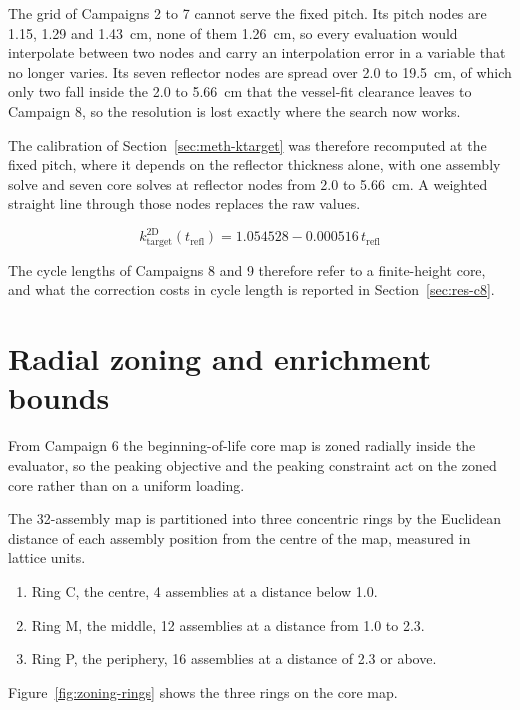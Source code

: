 The grid of Campaigns 2 to 7 cannot serve the fixed pitch. Its pitch
nodes are 1.15, 1.29 and \SI{1.43}{cm}, none of them \SI{1.26}{cm}, so
every evaluation would interpolate between two nodes and carry an
interpolation error in a variable that no longer varies. Its seven
reflector nodes are spread over 2.0 to \SI{19.5}{cm}, of which only two
fall inside the 2.0 to \SI{5.66}{cm} that the vessel-fit clearance
leaves to Campaign 8, so the resolution is lost exactly where the
search now works.

The calibration of Section~\ref{sec:meth-ktarget} was therefore
recomputed at the fixed pitch, where it depends on the reflector
thickness alone, with one assembly solve and seven core solves at
reflector nodes from 2.0 to \SI{5.66}{cm}. A weighted straight line
through those nodes replaces the raw values.

\begin{equation}
k_\mathrm{target}^\mathrm{2D}(t_\mathrm{refl}) = 1.054528 - 0.000516\, t_\mathrm{refl}
\label{eq:ktarget-c8-fit}
\end{equation}

The cycle lengths of Campaigns 8 and 9 therefore refer to a
finite-height core, and what the correction costs in cycle length is
reported in Section~\ref{sec:res-c8}.


\section{Radial zoning and enrichment bounds}
\label{sec:meth-zoning}

From Campaign 6 the beginning-of-life core map is zoned radially inside
the evaluator, so the peaking objective and the peaking constraint act
on the zoned core rather than on a uniform loading.

The 32-assembly map is partitioned into three concentric rings by the
Euclidean distance of each assembly position from the centre of the
map, measured in lattice units.

\begin{enumerate}
  \item Ring C, the centre, 4 assemblies at a distance below 1.0.
  \item Ring M, the middle, 12 assemblies at a distance from 1.0 to
        2.3.
  \item Ring P, the periphery, 16 assemblies at a distance of 2.3 or
        above.
\end{enumerate}

Figure~\ref{fig:zoning-rings} shows the three rings on the core map.

